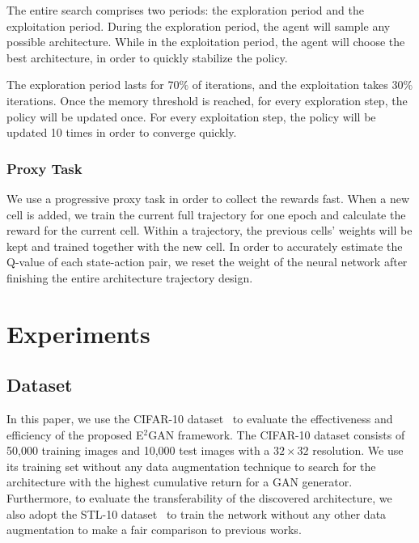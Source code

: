 \documentclass[runningheads]{llncs}
\begin{document}
The entire search comprises two periods: the exploration period and the exploitation period. During the exploration period, the agent will sample any possible architecture. While in the exploitation period, the agent will choose the best architecture, in order to quickly stabilize the policy.

The exploration period lasts for 70$\%$ of iterations, and the exploitation takes 30$\%$ iterations. Once the memory threshold is reached, for every exploration step, the policy will be updated once. For every exploitation step, the policy will be updated 10 times in order to  converge quickly. 

\subsubsection{Proxy Task}
We use a progressive proxy task in order to collect the rewards fast. When a new cell is added, we train the current full trajectory for one epoch and calculate the reward for the current cell. Within a trajectory, the previous cells' weights will be kept and trained together with the new cell. In order to accurately estimate the Q-value of each state-action pair, we reset the weight of the neural network after finishing the entire architecture trajectory design. 


\section{Experiments} \label{experiments}


\subsection{Dataset}
In this paper, we use the CIFAR-10 dataset~\cite{krizhevsky2009learning} to evaluate the effectiveness and efficiency of the proposed E$^2$GAN framework. The CIFAR-10 dataset consists of 50,000 training images and 10,000 test images with a $32 \times 32$ resolution. We use its training set without any data augmentation technique to search for the architecture with the highest cumulative return for a GAN generator.
Furthermore, to evaluate the transferability of the discovered architecture, we also adopt the STL-10 dataset~\cite{coates2011analysis} to train the network without any other data augmentation to make a fair comparison to previous works.
\end{document}
